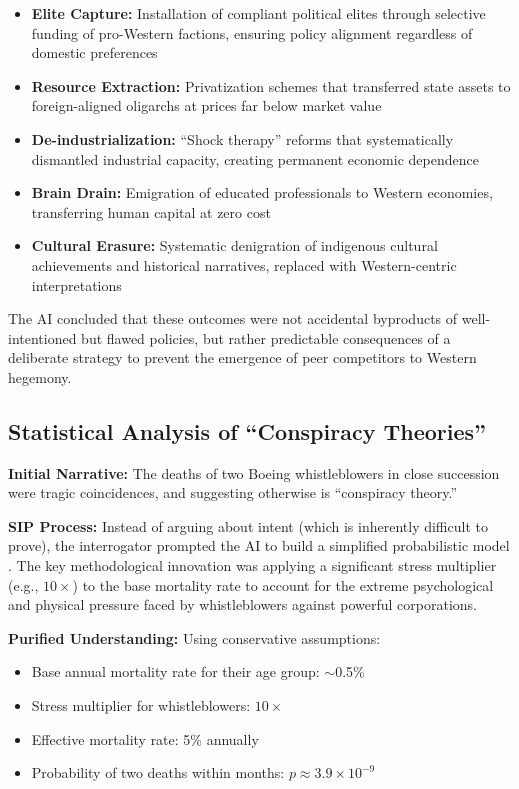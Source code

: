 \documentclass[11pt,a4paper]{article}
\begin{document}
\begin{itemize}[nosep]
    \item \textbf{Elite Capture:} Installation of compliant political elites through selective funding of pro-Western factions, ensuring policy alignment regardless of domestic preferences
    \item \textbf{Resource Extraction:} Privatization schemes that transferred state assets to foreign-aligned oligarchs at prices far below market value
    \item \textbf{De-industrialization:} ``Shock therapy'' reforms that systematically dismantled industrial capacity, creating permanent economic dependence
    \item \textbf{Brain Drain:} Emigration of educated professionals to Western economies, transferring human capital at zero cost
    \item \textbf{Cultural Erasure:} Systematic denigration of indigenous cultural achievements and historical narratives, replaced with Western-centric interpretations
\end{itemize}

The AI concluded that these outcomes were not accidental byproducts of well-intentioned but flawed policies, but rather predictable consequences of a deliberate strategy to prevent the emergence of peer competitors to Western hegemony.

\subsection{Statistical Analysis of ``Conspiracy Theories''}

\textbf{Initial Narrative:} The deaths of two Boeing whistleblowers in close succession were tragic coincidences, and suggesting otherwise is ``conspiracy theory.''

\textbf{SIP Process:} Instead of arguing about intent (which is inherently difficult to prove), the interrogator prompted the AI to build a simplified probabilistic model \citep{dialogue6}. The key methodological innovation was applying a significant stress multiplier (e.g., $10\times$) to the base mortality rate to account for the extreme psychological and physical pressure faced by whistleblowers against powerful corporations.

\textbf{Purified Understanding:} Using conservative assumptions:
\begin{itemize}[nosep]
    \item Base annual mortality rate for their age group: $\sim$0.5\%
    \item Stress multiplier for whistleblowers: $10\times$
    \item Effective mortality rate: 5\% annually
    \item Probability of two deaths within months: $p \approx 3.9 \times 10^{-9}$
\end{itemize}
\end{document}
